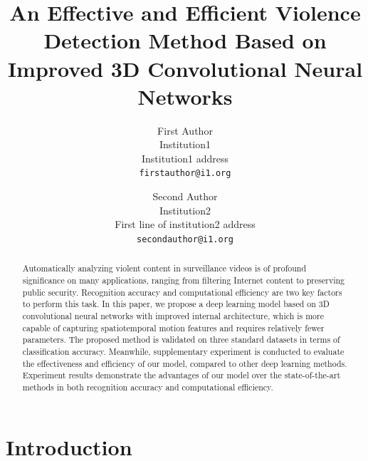 \documentclass[10pt,twocolumn,letterpaper]{article}
\begin{document}
\title{An Effective and Efficient Violence Detection Method Based on Improved 3D Convolutional Neural Networks}

\author{First Author\\
Institution1\\
Institution1 address\\
{\tt\small firstauthor@i1.org}
\and
Second Author\\
Institution2\\
First line of institution2 address\\
{\tt\small secondauthor@i1.org}
}

\maketitle

\begin{abstract}
Automatically analyzing violent content in surveillance videos is of profound significance on many applications, ranging from filtering Internet content to preserving public security. Recognition accuracy and computational efficiency are two key factors to perform this task. In this paper, we propose a deep learning model based on 3D convolutional neural networks with improved internal architecture, which is more capable of capturing spatiotemporal motion features and requires relatively fewer parameters. The proposed method is validated on three standard datasets in terms of classification accuracy. Meanwhile, supplementary experiment is conducted to evaluate the effectiveness and efficiency of our model, compared to other deep learning methods. Experiment results demonstrate the advantages of our model over the state-of-the-art methods in both recognition accuracy and computational efficiency.
\end{abstract}

\section{Introduction} \label{sec:1}
\end{document}
